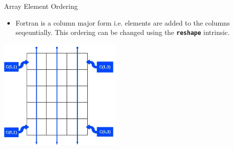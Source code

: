 \documentclass[slidestop,mathserif,compress,xcolor=svgnames]{beamer}
\begin{document}
\begin{frame}[allowframebreaks]
  \begin{block}{\scriptsize Array Element Ordering}
    \begin{itemize}
      \item Fortran is a column major form i.e. elements are added to the columns seqeuntially. This ordering can be changed using the \textbf{\texttt{reshape}} intrinsic.
    \end{itemize}
  \end{block}
  \begin{center}
    \includegraphics[width=6cm,clip=true]{./array5}
  \end{center}
\end{frame}
\end{document}
